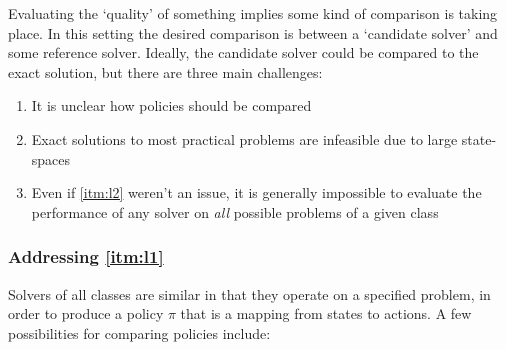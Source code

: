    Evaluating the `quality' of something implies some kind of comparison is taking place. In this setting the desired comparison is between a `candidate solver' \solve{} and some reference solver. Ideally, the candidate solver could be compared to the exact solution, but there are three main challenges:

    \begin{enumerate}[label=\textbf{C\arabic*}]
        \item It is unclear how policies should be compared \label{itm:l1}
        \item Exact solutions to most practical problems are infeasible due to large state-spaces \label{itm:l2}
        \item Even if \ref{itm:l2} weren't an issue, it is generally impossible to evaluate the performance of any solver on \emph{all} possible problems \label{itm:l3} of a given class
    \end{enumerate}

    \subsubsection{Addressing \ref{itm:l1}} \label{sec:compare_policies}
        Solvers of all classes are similar in that they operate on a specified problem, in order to produce a policy $\pi$ that is a mapping from states to actions. A few possibilities for comparing policies include:
    

